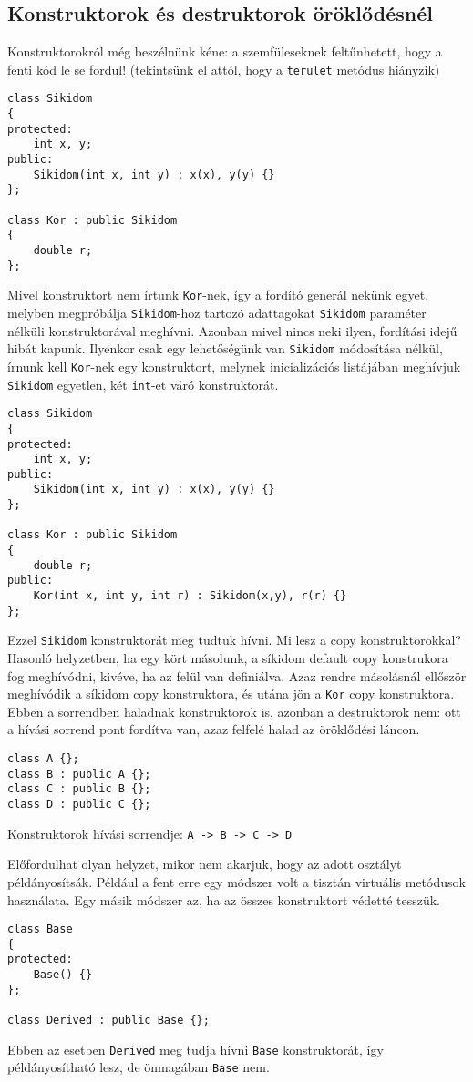 \documentclass[a4paper,11.5pt]{article}
\begin{document}
	\subsection{Konstruktorok és destruktorok öröklődésnél}
	Konstruktorokról még beszélnünk kéne: a szemfüleseknek feltűnhetett, hogy a fenti kód le se fordul! (tekintsünk el attól, hogy a \texttt{terulet} metódus hiányzik)
	\begin{lstlisting}
class Sikidom
{
protected:
	int x, y;
public:
	Sikidom(int x, int y) : x(x), y(y) {}
};

class Kor : public Sikidom
{
	double r;
};
	\end{lstlisting}
	Mivel konstruktort nem írtunk \texttt{Kor}-nek, így a fordító generál nekünk egyet, melyben megpróbálja \texttt{Sikidom}-hoz tartozó adattagokat \texttt{Sikidom} paraméter nélküli konstruktorával meghívni. Azonban mivel nincs neki ilyen, fordítási idejű hibát kapunk. Ilyenkor csak egy lehetőségünk van \texttt{Sikidom} módosítása nélkül, írnunk kell \texttt{Kor}-nek egy konstruktort, melynek inicializációs listájában meghívjuk \texttt{Sikidom} egyetlen, két \texttt{int}-et váró konstruktorát.
\begin{lstlisting}
class Sikidom
{
protected:
	int x, y;
public:
	Sikidom(int x, int y) : x(x), y(y) {}
};

class Kor : public Sikidom
{
	double r;
public:
	Kor(int x, int y, int r) : Sikidom(x,y), r(r) {}
};
\end{lstlisting}
	Ezzel \texttt{Sikidom} konstruktorát meg tudtuk hívni. Mi lesz a copy konstruktorokkal? Hasonló helyzetben, ha egy kört másolunk, a síkidom default copy konstrukora fog meghívódni, kivéve, ha az felül van definiálva. Azaz rendre másolásnál ellőször meghívódik a síkidom copy konstruktora, és utána jön a \texttt{Kor} copy konstruktora. Ebben a sorrendben haladnak konstruktorok is, azonban a destruktorok nem: ott a hívási sorrend pont fordítva van, azaz felfelé halad az öröklődési láncon.
	
	\begin{lstlisting}
class A {};
class B : public A {};
class C : public B {};
class D : public C {};
	\end{lstlisting}
	Konstruktorok hívási sorrendje: \texttt{A -> B -> C -> D}
	
	\medskip
	Előfordulhat olyan helyzet, mikor nem akarjuk, hogy az adott osztályt példányosítsák. Például a fent erre egy módszer volt a tisztán virtuális metódusok használata. Egy másik módszer az, ha az összes konstruktort védetté tesszük.
	\begin{lstlisting}
class Base
{
protected:
	Base() {}
};

class Derived : public Base {};
	\end{lstlisting}
	Ebben az esetben \texttt{Derived} meg tudja hívni \texttt{Base} konstruktorát, így példányosítható lesz, de önmagában \texttt{Base} nem.
	\bigskip
	
\end{document}
